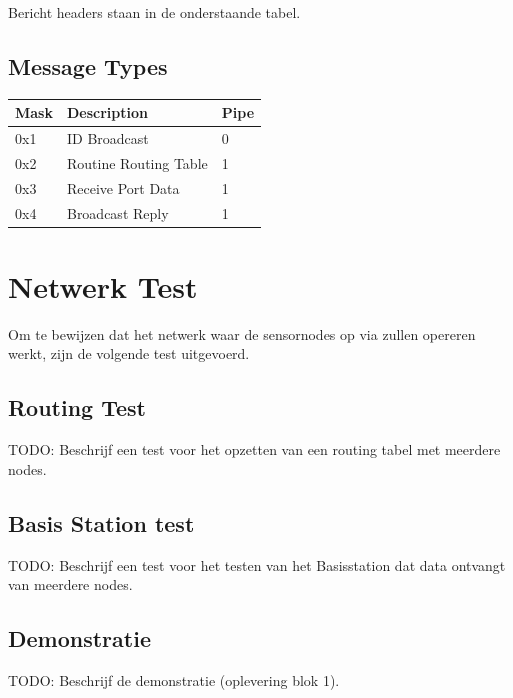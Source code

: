 \documentclass[a4paper, 11pt]{article}
\begin{document}
Bericht headers staan in de onderstaande tabel.

\subsection*{Message Types}
\begin{table}[!ht]
\begin{tabular}{|l|l|l|}
\hline
\rowcolor[HTML]{EFEFEF} 
Mask & Description           & Pipe \\ \hline
0x1  & ID Broadcast          & 0    \\ \hline
0x2  & Routine Routing Table & 1    \\ \hline
0x3  & Receive Port Data     & 1    \\ \hline
0x4  & Broadcast Reply       & 1    \\ \hline
\end{tabular}
\end{table}

\section{Netwerk Test}
Om te bewijzen dat het netwerk waar de sensornodes op via zullen opereren werkt, zijn de volgende test uitgevoerd. 
\subsection{Routing Test}
TODO: Beschrijf een test voor het opzetten van een routing tabel met meerdere nodes.
\subsection{Basis Station test}
TODO: Beschrijf een test voor het testen van het Basisstation dat data ontvangt van meerdere nodes. 
\subsection{Demonstratie}
TODO: Beschrijf de demonstratie (oplevering blok 1).

\newpage


 
\end{document}
